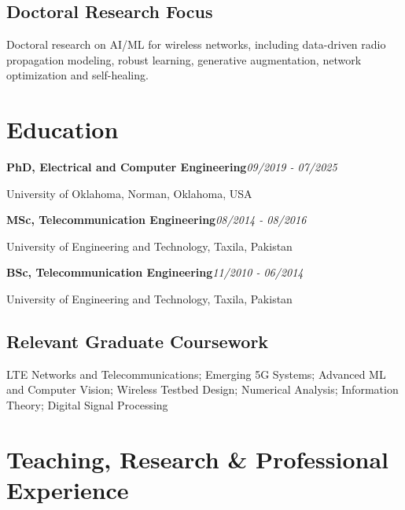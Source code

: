\documentclass[9pt,letterpaper]{extarticle}
\newcommand{\entry}[2]{\Needspace{4\baselineskip}\textbf{#1}\hfill\textit{#2}\par}
\begin{document}
\subsection{Doctoral Research Focus}
Doctoral research on AI/ML for wireless networks, including data-driven radio propagation modeling, robust learning, generative augmentation, network optimization and self-healing.\par
{}
\section{Education}
\entry{PhD, Electrical and Computer Engineering}{09/2019 - 07/2025}
University of Oklahoma, Norman, Oklahoma, USA\par
\entry{MSc, Telecommunication Engineering}{08/2014 - 08/2016}
University of Engineering and Technology, Taxila, Pakistan\par
\entry{BSc, Telecommunication Engineering}{11/2010 - 06/2014}
University of Engineering and Technology, Taxila, Pakistan\par
{}
\subsection{Relevant Graduate Coursework}
LTE Networks and Telecommunications; Emerging 5G Systems; Advanced ML and Computer Vision; Wireless Testbed Design; Numerical Analysis; Information Theory; Digital Signal Processing\par
{}
\section{Teaching, Research \& Professional Experience}
\end{document}
